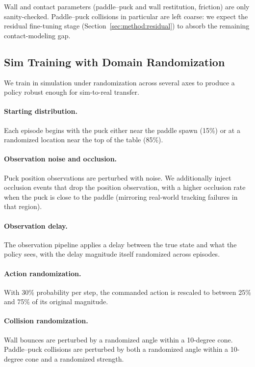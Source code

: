 \documentclass{article}
\begin{document}
    Wall and contact parameters (paddle--puck and wall restitution, friction) are only sanity-checked. Paddle--puck collisions in particular are left coarse: we expect the residual fine-tuning stage (Section~\ref{sec:method:residual}) to absorb the remaining contact-modeling gap.

\subsection{Sim Training with Domain Randomization}
\label{sec:method:randomization}

    We train in simulation under randomization across several axes to produce a policy robust enough for sim-to-real transfer.

    \paragraph{Starting distribution.} Each episode begins with the puck either near the paddle spawn (15\%) or at a randomized location near the top of the table (85\%).

    \paragraph{Observation noise and occlusion.} Puck position observations are perturbed with noise. We additionally inject occlusion events that drop the position observation, with a higher occlusion rate when the puck is close to the paddle (mirroring real-world tracking failures in that region).

    \paragraph{Observation delay.} The observation pipeline applies a delay between the true state and what the policy sees, with the delay magnitude itself randomized across episodes.

    \paragraph{Action randomization.} With 30\% probability per step, the commanded action is rescaled to between 25\% and 75\% of its original magnitude.

    \paragraph{Collision randomization.} Wall bounces are perturbed by a randomized angle within a 10-degree cone. Paddle--puck collisions are perturbed by both a randomized angle within a 10-degree cone and a randomized strength.
\end{document}
